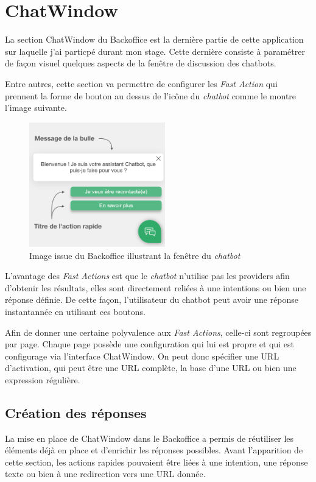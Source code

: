 \documentclass[12pt,a4paper,oneside]{scrreprt}
\begin{document}
\section{ChatWindow}

La section ChatWindow du Backoffice est la dernière partie de cette application sur laquelle j'ai particpé durant mon stage. Cette dernière consiste à paramétrer de façon visuel quelques aspects de la fenêtre de discussion des chatbots.

Entre autres, cette section va permettre de configurer les \textit{Fast Action} qui prennent la forme de bouton au dessus de l'icône du \textit{chatbot} comme le montre l'image suivante.

\begin{figure}[!ht]
	\centering
	\includegraphics[width=5.9cm]{pictures/fa.png}
	\caption{Image issue du Backoffice illustrant la fenêtre du \textit{chatbot}}
\end{figure}

L'avantage des \textit{Fast Actions} est que le \textit{chatbot} n'utilise pas les providers afin d'obtenir les résultats, elles sont directement reliées à une intentions ou bien une réponse définie. De cette façon, l'utilisateur du chatbot peut avoir une réponse instantannée en utilisant ces boutons.

Afin de donner une certaine polyvalence aux \textit{Fast Actions}, celle-ci sont regroupées par page. Chaque page possède une configuration qui lui est propre et qui est configurage via l'interface ChatWindow. On peut donc spécifier une URL d'activation, qui peut être une URL complète, la base d'une URL ou bien une expression régulière.

\subsection*{Création des réponses}

La mise en place de ChatWindow dans le Backoffice a permis de réutiliser les éléments déjà en place et d'enrichir les réponses possibles. Avant l'apparition de cette section, les actions rapides pouvaient être liées à une intention, une réponse texte ou bien à une redirection vers une URL donnée.
\end{document}
